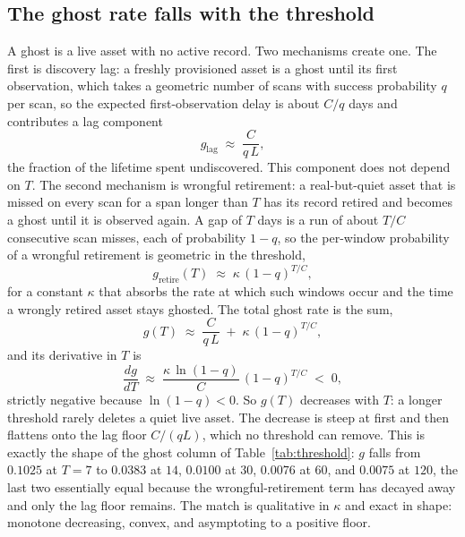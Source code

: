 \documentclass[journal]{IEEEtran}
\begin{document}
\subsection{The ghost rate falls with the threshold}
A ghost is a live asset with no active record. Two mechanisms create one. The first is discovery
lag: a freshly provisioned asset is a ghost until its first observation, which takes a geometric
number of scans with success probability $q$ per scan, so the expected first-observation delay is
about $C / q$ days and contributes a lag component
\begin{equation}
g_{\text{lag}} \;\approx\; \frac{C}{q\,L},
\label{eq:glag}
\end{equation}
the fraction of the lifetime spent undiscovered. This component does not depend on $T$. The second
mechanism is wrongful retirement: a real-but-quiet asset that is missed on every scan for a span
longer than $T$ has its record retired and becomes a ghost until it is observed again. A gap of $T$
days is a run of about $T / C$ consecutive scan misses, each of probability $1 - q$, so the
per-window probability of a wrongful retirement is geometric in the threshold,
\begin{equation}
g_{\text{retire}}(T) \;\approx\; \kappa \,(1 - q)^{T / C},
\label{eq:gretire}
\end{equation}
for a constant $\kappa$ that absorbs the rate at which such windows occur and the time a wrongly
retired asset stays ghosted. The total ghost rate is the sum,
\begin{equation}
g(T) \;\approx\; \frac{C}{q\,L} \;+\; \kappa \,(1 - q)^{T / C},
\label{eq:gtotal}
\end{equation}
and its derivative in $T$ is
\begin{equation}
\frac{dg}{dT} \;\approx\; \frac{\kappa \,\ln(1 - q)}{C}\,(1 - q)^{T / C} \;<\; 0,
\label{eq:dgdt}
\end{equation}
strictly negative because $\ln(1 - q) < 0$. So $g(T)$ decreases with $T$: a longer threshold rarely
deletes a quiet live asset. The decrease is steep at first and then flattens onto the lag floor
$C / (q L)$, which no threshold can remove. This is exactly the shape of the ghost column of
Table~\ref{tab:threshold}: $g$ falls from $0.1025$ at $T = 7$ to $0.0383$ at $14$, $0.0100$ at $30$,
$0.0076$ at $60$, and $0.0075$ at $120$, the last two essentially equal because the wrongful-retirement
term has decayed away and only the lag floor remains. The match is qualitative in $\kappa$ and exact
in shape: monotone decreasing, convex, and asymptoting to a positive floor.
\end{document}
